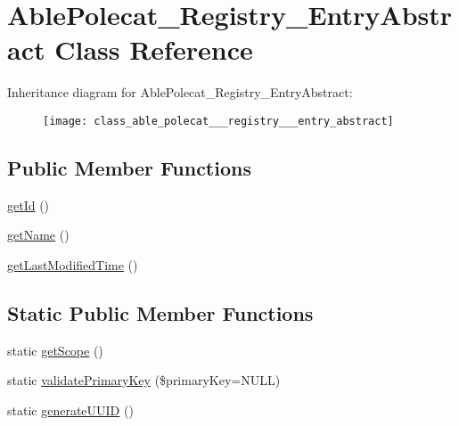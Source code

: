 \hypertarget{class_able_polecat___registry___entry_abstract}{}\section{Able\+Polecat\+\_\+\+Registry\+\_\+\+Entry\+Abstract Class Reference}
\label{class_able_polecat___registry___entry_abstract}
Inheritance diagram for Able\+Polecat\+\_\+\+Registry\+\_\+\+Entry\+Abstract\+:\begin{figure}[H]
\begin{center}
\leavevmode
\texttt{[image: class\_able\_polecat\_\_\_registry\_\_\_entry\_abstract]}
\end{center}
\end{figure}
\subsection*{Public Member Functions}
\begin{DoxyCompactItemize}
\item 
\hyperlink{class_able_polecat___registry___entry_abstract_a12251d0c022e9e21c137a105ff683f13}{get\+Id} ()
\item 
\hyperlink{class_able_polecat___registry___entry_abstract_a3d0963e68bb313b163a73f2803c64600}{get\+Name} ()
\item 
\hyperlink{class_able_polecat___registry___entry_abstract_ada825a3515aa1569a1a2893c47a643b9}{get\+Last\+Modified\+Time} ()
\end{DoxyCompactItemize}
\subsection*{Static Public Member Functions}
\begin{DoxyCompactItemize}
\item 
static \hyperlink{class_able_polecat___registry___entry_abstract_ad9ade868bd136d32967059d1cccb3e92}{get\+Scope} ()
\item 
static \hyperlink{class_able_polecat___registry___entry_abstract_aedcd0eb79d1e9572c8ed52ccaf31c3c8}{validate\+Primary\+Key} (\$primary\+Key=N\+U\+L\+L)
\item 
static \hyperlink{class_able_polecat___registry___entry_abstract_a4a9230cc2bec2f2ab12d0ed53bb18865}{generate\+U\+U\+I\+D} ()
\end{DoxyCompactItemize}
